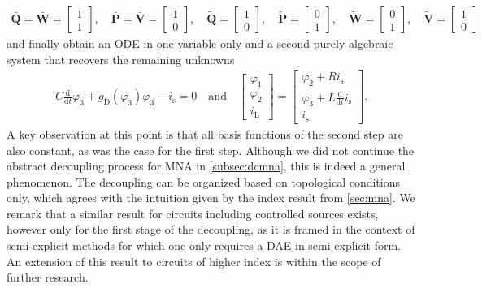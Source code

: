\documentclass[AMA,STIX1COL]{WileyNJD-v2}
\newcommand{\mbt}[1]{\tilde{\mathbf{#1}}}
\newcommand{\mbb}[1]{\bar{\mathbf{#1}}}
\newcommand{\mr}[1]{\mathrm{#1}}
\newcommand{\ddt}{\frac{\mathrm{d}}{\mathrm{d}t}}
\begin{document}
\begin{align*}
    \mbb{Q} = \mbb{W} = \begin{bmatrix}
        1\\
        1
    \end{bmatrix}, \quad \mbb{P} = \bar{\mathbf{V}} = \begin{bmatrix}
        1\\
        0
    \end{bmatrix}, \quad \mbt{Q} = \begin{bmatrix}
        1\\
        0
    \end{bmatrix}, \quad \mbt{P} = \begin{bmatrix}
        0\\
        1
    \end{bmatrix}, \quad \mbt{W} = \begin{bmatrix}
        0\\
        1
    \end{bmatrix}, \quad \mbt{V} = \begin{bmatrix}
        1\\
        0
    \end{bmatrix}
\end{align*}
and finally obtain an ODE in one variable only and a second purely algebraic system that recovers the remaining unknowns
\begin{align}
    C \ddt \varphi_3 + g_\mr{D}(\varphi_3) \varphi_3 - i_\mr{s} = 0 \quad
    \text{and} \quad \begin{bmatrix}
        \varphi_1\\
        \varphi_2\\
        i_\mr{L}
    \end{bmatrix} = \begin{bmatrix}
        \varphi_2 + R i_\mr{s}\\
        \varphi_3 + L \ddt i_\mr{s}\\
        i_\mr{s}
    \end{bmatrix} \label{eq:do2}.
\end{align}
A key observation at this point is that all basis functions of the second step are also constant, as was the case for the first step. Although we did not continue the abstract decoupling process for MNA in \autoref{subsec:dcmna}, this is indeed a general phenomenon. The decoupling can be organized based on topological conditions only\cite{jansen2014}, which agrees with the intuition given by the index result from \autoref{sec:mna}. %
We remark that a similar result for circuits including controlled sources exists, however only for the first stage of the decoupling, as it is framed in the context of semi-explicit methods for which one only requires a DAE in semi-explicit form\cite{jansen2014}. An extension of this result to circuits of higher index is within the scope of further research.
\end{document}
